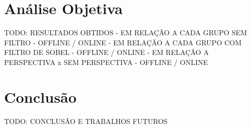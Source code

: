  
 
 \section{Análise Objetiva}
 
TODO: RESULTADOS OBTIDOS
 - EM RELAÇÃO A CADA GRUPO SEM FILTRO - OFFLINE / ONLINE
 - EM RELAÇÃO A CADA GRUPO COM FILTRO DE SOBEL - OFFLINE / ONLINE
 - EM RELAÇÃO A PERSPECTIVA x SEM PERSPECTIVA - OFFLINE / ONLINE
 


\section{Conclusão}
TODO: CONCLUSÃO E TRABALHOS FUTUROS

